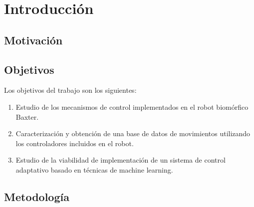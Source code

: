 \chapter{Introducción}
\section{Motivación}
\section{Objetivos}
Los objetivos del trabajo son los siguientes:
\begin{enumerate}
	\item Estudio de los mecanismos de control implementados en el robot biomórfico Baxter.
	\item Caracterización y obtención de una base de datos de movimientos utilizando los controladores incluidos en el robot.
	\item Estudio de la viabilidad de implementación de un sistema de control adaptativo basado en técnicas de machine learning.
\end{enumerate}
\section{Metodología}
%
%
%
%
